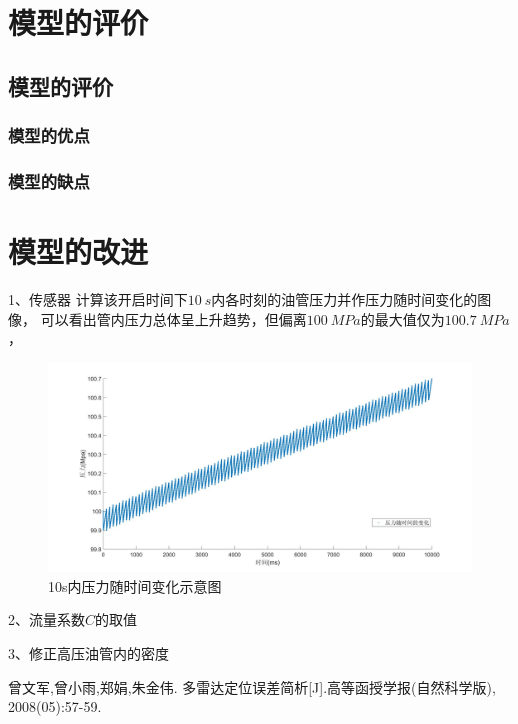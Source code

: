\documentclass[withoutpreface,bwprint]{cumcmthesis} %
\begin{document}
\section{模型的评价}
\subsection{模型的评价}
\subsubsection{模型的优点}

\subsubsection{模型的缺点}

\section{模型的改进}
1、传感器
    计算该开启时间下$10~s$内各时刻的油管压力并作压力随时间变化的图像，
    可以看出管内压力总体呈上升趋势，但偏离$100~MPa$的最大值仅为$100.7~MPa$，

    \begin{figure}[!h]
    \centering
    \includegraphics[width=.95\textwidth]{100Mpa10secs.jpg}
    \caption{10s内压力随时间变化示意图}
    \label{figure3.5}
    \end{figure}


2、流量系数$C$的取值

3、修正高压油管内的密度
   

\begin{thebibliography}{9}%
曾文军,曾小雨,郑娟,朱金伟.
    多雷达定位误差简析[J].高等函授学报(自然科学版),
    2008(05):57-59.

\end{thebibliography}
\end{document}
